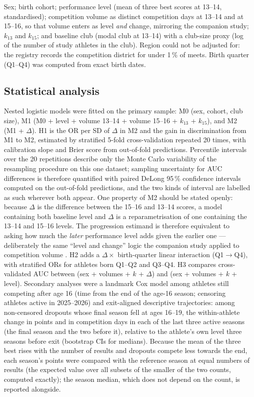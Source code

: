 \documentclass[12pt,a4paper]{article}
\begin{document}
Sex; birth cohort; performance level (mean of three best scores at 13--14, standardised); competition volume as distinct competition days at 13--14 and at 15--16, so that volume enters as level \emph{and} change, mirroring the companion study; $k_{13}$ and $k_{15}$; and baseline club (modal club at 13--14) with a club-size proxy (log of the number of study athletes in the club). Region could not be adjusted for: the registry records the competition district for under 1\,\% of meets. Birth quarter (Q1--Q4) was computed from exact birth dates.

\subsection{Statistical analysis}

Nested logistic models were fitted on the primary sample: M0 (sex, cohort, club size), M1 (M0 + level + volume 13--14 + volume 15--16 + $k_{13}$ + $k_{15}$), and M2 (M1 + $\Delta$). H1 is the OR per SD of $\Delta$ in M2 and the gain in discrimination from M1 to M2, estimated by stratified 5-fold cross-validation repeated 20 times, with calibration slope and Brier score from out-of-fold predictions. Percentile intervals over the 20 repetitions describe only the Monte Carlo variability of the resampling procedure on this one dataset; sampling uncertainty for AUC differences is therefore quantified with paired DeLong 95\,\% confidence intervals computed on the out-of-fold predictions, and the two kinds of interval are labelled as such wherever both appear. One property of M2 should be stated openly: because $\Delta$ is the difference between the 15--16 and 13--14 scores, a model containing both baseline level and $\Delta$ is a reparametrisation of one containing the 13--14 and 15--16 levels. The progression estimand is therefore equivalent to asking how much the \emph{later} performance level adds given the earlier one --- deliberately the same ``level and change'' logic the companion study applied to competition volume \cite{guttormsen2026dropout}. H2 adds a $\Delta \times$ birth-quarter linear interaction (Q1$\to$Q4), with stratified ORs for athletes born Q1--Q2 and Q3--Q4. H3 compares cross-validated AUC between (sex + volumes + $k$ + $\Delta$) and (sex + volumes + $k$ + level). Secondary analyses were a landmark Cox model among athletes still competing after age 16 (time from the end of the age-16 season; censoring athletes active in 2025--2026) and exit-aligned descriptive trajectories: among non-censored dropouts whose final season fell at ages 16--19, the within-athlete change in points and in competition days in each of the last three active seasons (the final season and the two before it), relative to the athlete's own level three seasons before exit (bootstrap CIs for medians). Because the mean of the three best rises with the number of results and dropouts compete less towards the end, each season's points were compared with the reference season at equal numbers of results (the expected value over all subsets of the smaller of the two counts, computed exactly); the season median, which does not depend on the count, is reported alongside.
\end{document}
